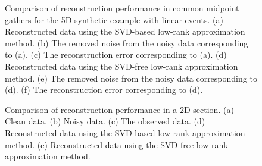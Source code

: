 \begin{figure}[htb!]
  \centering
   \caption{Comparison of reconstruction performance in common midpoint gathers for the 5D synthetic example with linear events. (a) Reconstructed data using the SVD-based low-rank approximation method. (b) The removed noise from the noisy data corresponding to (a). (c) The reconstruction error corresponding to (a). (d) Reconstructed data using the SVD-free low-rank approximation method. (e) The removed noise from the noisy data corresponding to (d). (f) The reconstruction error corresponding to (d).}
\label{fig:syn5d-svd-3d-1,syn5d-n-svd-3d-1,syn5d-r-svd-3d-1,syn5d-lmafit-3d-1,syn5d-n-lmafit-3d-1,syn5d-r-lmafit-3d-1}
\end{figure}



\begin{figure}[htb!]
  \centering
   \caption{Comparison of reconstruction performance in a 2D section. (a) Clean data. (b) Noisy data. (c) The observed data. (d) Reconstructed data using the SVD-based low-rank approximation method. (e) Reconstructed data using the SVD-free low-rank approximation method.}
\label{fig:syn5d-clean-2d,syn5d-noisy-2d,syn5d-decimated-2d,syn5d-svd-2d,syn5d-lmafit-2d}
\end{figure}


